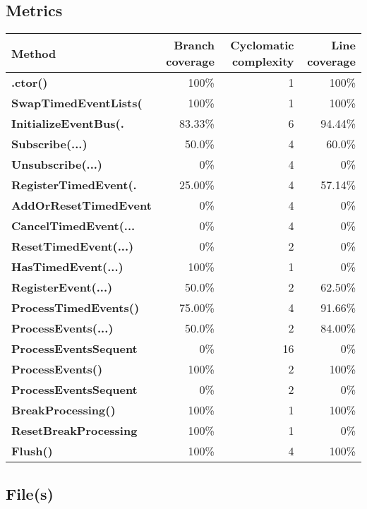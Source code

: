 \documentclass[a4paper,landscape,10pt]{article}
\begin{document}
\subsection{Metrics}
\begin{longtable}[l]{|l|r|r|r|}
\hline
\textbf{Method} & \textbf{Branch coverage} & \textbf{Cyclomatic complexity} & \textbf{Line coverage}\\
\hline
\textbf{.ctor()} & 100\% & 1 & 100\%\\
\hline
\textbf{SwapTimedEventLists(} & 100\% & 1 & 100\%\\
\hline
\textbf{InitializeEventBus(.} & 83.33\% & 6 & 94.44\%\\
\hline
\textbf{Subscribe(...)} & 50.0\% & 4 & 60.0\%\\
\hline
\textbf{Unsubscribe(...)} & 0\% & 4 & 0\%\\
\hline
\textbf{RegisterTimedEvent(.} & 25.00\% & 4 & 57.14\%\\
\hline
\textbf{AddOrResetTimedEvent} & 0\% & 4 & 0\%\\
\hline
\textbf{CancelTimedEvent(...} & 0\% & 4 & 0\%\\
\hline
\textbf{ResetTimedEvent(...)} & 0\% & 2 & 0\%\\
\hline
\textbf{HasTimedEvent(...)} & 100\% & 1 & 0\%\\
\hline
\textbf{RegisterEvent(...)} & 50.0\% & 2 & 62.50\%\\
\hline
\textbf{ProcessTimedEvents()} & 75.00\% & 4 & 91.66\%\\
\hline
\textbf{ProcessEvents(...)} & 50.0\% & 2 & 84.00\%\\
\hline
\textbf{ProcessEventsSequent} & 0\% & 16 & 0\%\\
\hline
\textbf{ProcessEvents()} & 100\% & 2 & 100\%\\
\hline
\textbf{ProcessEventsSequent} & 0\% & 2 & 0\%\\
\hline
\textbf{BreakProcessing()} & 100\% & 1 & 100\%\\
\hline
\textbf{ResetBreakProcessing} & 100\% & 1 & 0\%\\
\hline
\textbf{Flush()} & 100\% & 4 & 100\%\\
\hline
\end{longtable}
\subsection{File(s)}
\end{document}
